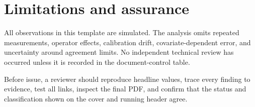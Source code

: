 \chapter{Limitations and assurance}

All observations in this template are simulated. The analysis omits repeated
measurements, operator effects, calibration drift, covariate-dependent error,
and uncertainty around agreement limits. No independent technical review has
occurred unless it is recorded in the document-control table.

Before issue, a reviewer should reproduce headline values, trace every finding
to evidence, test all links, inspect the final PDF, and confirm that the status
and classification shown on the cover and running header agree.

